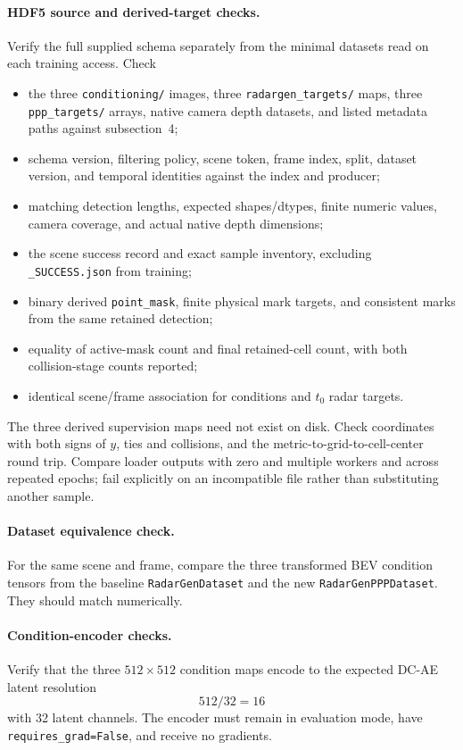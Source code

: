 \documentclass[11pt,a4paper]{article}
\begin{document}
\paragraph{HDF5 source and derived-target checks.}
Verify the full supplied schema separately from the minimal datasets read on each training access. Check
\begin{itemize}
 \item the three \texttt{conditioning/} images, three \texttt{radargen\_targets/} maps, three \texttt{ppp\_targets/} arrays, native camera depth datasets, and listed metadata paths against subsection~4;
 \item schema version, filtering policy, scene token, frame index, split, dataset version, and temporal identities against the index and producer;
 \item matching detection lengths, expected shapes/dtypes, finite numeric values, camera coverage, and actual native depth dimensions;
 \item the scene success record and exact sample inventory, excluding \texttt{\_SUCCESS.json} from training;
 \item binary derived \texttt{point\_mask}, finite physical mark targets, and consistent marks from the same retained detection;
 \item equality of active-mask count and final retained-cell count, with both collision-stage counts reported;
 \item identical scene/frame association for conditions and \(t_0\) radar targets.
\end{itemize}
The three derived supervision maps need not exist on disk. Check coordinates with both signs of \(y\), ties and collisions, and the metric-to-grid-to-cell-center round trip. Compare loader outputs with zero and multiple workers and across repeated epochs; fail explicitly on an incompatible file rather than substituting another sample.

\paragraph{Dataset equivalence check.}
For the same scene and frame, compare the three transformed BEV condition tensors from the baseline \texttt{RadarGenDataset} and the new \texttt{RadarGenPPPDataset}. They should match numerically.

\paragraph{Condition-encoder checks.}
Verify that the three \(512\times512\) condition maps encode to the expected DC-AE latent resolution
\[
    512/32=16
\]
with 32 latent channels. The encoder must remain in evaluation mode, have \texttt{requires\_grad=False}, and receive no gradients.
\end{document}
